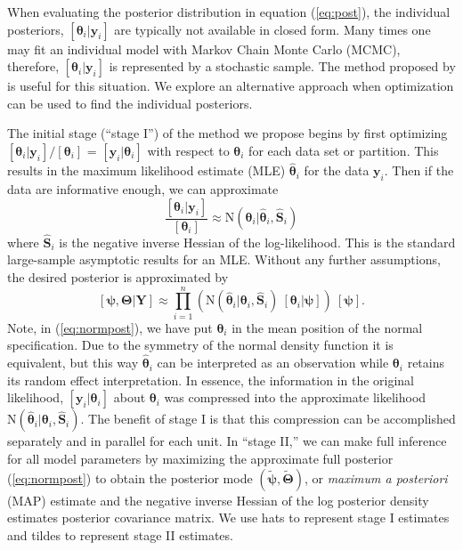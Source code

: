 \documentclass[12pt]{article}
\newcommand{\by}{\mathbf{y}}
\newcommand{\bt}{\boldsymbol{\theta}}
\newcommand{\bT}{\boldsymbol{\Theta}}
\newcommand{\bp}{\boldsymbol{\psi}}
\newcommand{\bS}{\mathbf{S}}
\newcommand{\bY}{\mathbf{Y}}
\begin{document}
When evaluating the posterior distribution in equation (\ref{eq:post}), the individual posteriors, $[\bt_i|\by_i]$ are typically not available in closed form. Many times one may fit an individual model with Markov Chain Monte Carlo (MCMC), therefore, $[\bt_i|\by_i]$ is represented by a stochastic sample. The method proposed by \citet{lunn2013fully} is useful for this situation. We explore an alternative approach when optimization can be used to find the individual posteriors.

The initial stage (``stage I'') of the method we propose begins by first optimizing $[\bt_i|\by_i]/[\bt_i]$ = $[\by_i|\bt_i]$ with respect to $\bt_i$ for each data set or partition. This results in the maximum likelihood estimate (MLE) $\hat{\bt}_i$ for the data $\by_i$. Then if the data are informative enough, we can approximate 
\[
\frac{[\bt_i|\by_i]}{[\bt_i]} \approx \text{N}(\bt_i|\hat{\bt}_i, \hat{\bS}_i)
\]
where $\hat{\bS}_i$ is the negative inverse Hessian of the log-likelihood. This is the standard large-sample asymptotic results for an MLE. Without any further assumptions, the desired posterior is approximated by
\begin{equation}
\label{eq:normpost}
[\bp,\bT|\bY] \approx  \prod_{i=1}^n\left(\text{N}(\hat{\bt}_i|\bt_i, \hat{\bS}_i)\ [\bt_i|\bp]\right)\ [\bp].
\end{equation}
Note, in (\ref{eq:normpost}), we have put $\bt_i$ in the mean position of the normal specification. Due to the symmetry of the normal density function it is equivalent, but this way $\hat{\bt}_i$ can be interpreted as an observation while $\bt_i$ retains its random effect interpretation. In essence, the information in the original likelihood, $[\by_i|\bt_i]$ about $\bt_i$ was compressed into the approximate likelihood $\text{N}(\hat{\bt}_i|\bt_i, \hat{\bS}_i)$. The benefit of stage I is that this compression can be accomplished separately and in parallel for each unit. In ``stage II,'' we can make full inference for all model parameters by maximizing the approximate full posterior (\ref{eq:normpost}) to obtain the posterior mode $(\tilde{\bp},\tilde{\bT})$, or {\it maximum a posteriori} (MAP) estimate and the negative inverse Hessian of the log posterior density estimates posterior covariance matrix. We use hats to represent stage I estimates and tildes to represent stage II estimates.
\end{document}

